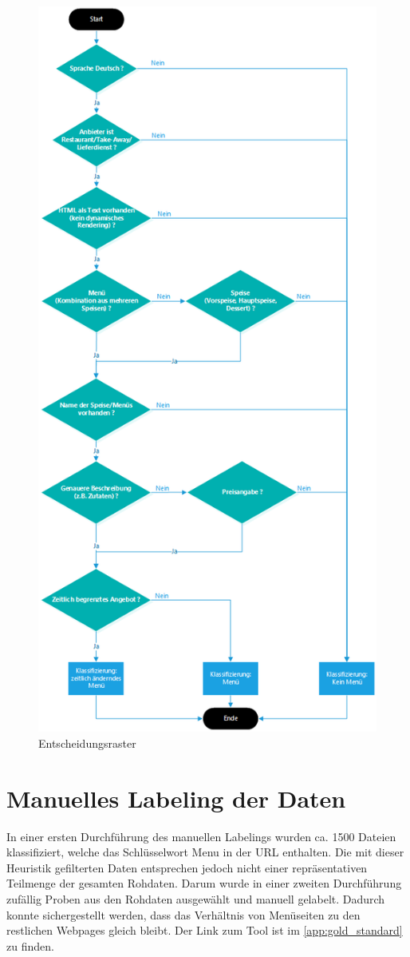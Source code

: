 \begin{figure}
	\centering
	\includegraphics[width=0.65\columnwidth,keepaspectratio]{img/man-classification-tree.png}
	\caption{Entscheidungsraster}
	\label{fig:classificationtree}
\end{figure}
\section{Manuelles Labeling der Daten}
In einer ersten Durchführung des manuellen Labelings wurden ca. 1500 Dateien klassifiziert, welche das Schlüsselwort \glqq Menu\grqq{} in der URL enthalten.
Die mit dieser Heuristik gefilterten Daten entsprechen jedoch nicht einer repräsentativen Teilmenge der gesamten Rohdaten.
Darum wurde in einer zweiten Durchführung zufällig Proben aus den Rohdaten ausgewählt und manuell gelabelt.
Dadurch konnte sichergestellt werden, dass das Verhältnis von Menüseiten zu den restlichen Webpages gleich bleibt.
Der Link zum Tool ist im \cref{app:gold_standard} zu finden.
